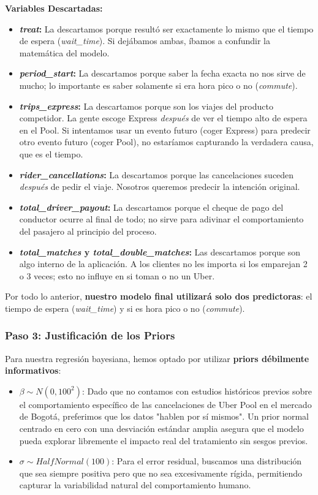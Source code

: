 \documentclass[11pt,a4paper]{article}
\begin{document}
\textbf{Variables Descartadas:}
\begin{itemize}
    \item \textbf{\textit{treat}:} La descartamos porque resultó ser exactamente lo mismo que el tiempo de espera (\textit{wait\_time}). Si dejábamos ambas, íbamos a confundir la matemática del modelo.
    \item \textbf{\textit{period\_start}:} La descartamos porque saber la fecha exacta no nos sirve de mucho; lo importante es saber solamente si era hora pico o no (\textit{commute}).
    \item \textbf{\textit{trips\_express}:} La descartamos porque son los viajes del producto competidor. La gente escoge Express \textit{después} de ver el tiempo alto de espera en el Pool. Si intentamos usar un evento futuro (coger Express) para predecir otro evento futuro (coger Pool), no estaríamos capturando la verdadera causa, que es el tiempo.
    \item \textbf{\textit{rider\_cancellations}:} La descartamos porque las cancelaciones suceden \textit{después} de pedir el viaje. Nosotros queremos predecir la intención original.
    \item \textbf{\textit{total\_driver\_payout}:} La descartamos porque el cheque de pago del conductor ocurre al final de todo; no sirve para adivinar el comportamiento del pasajero al principio del proceso.
    \item \textbf{\textit{total\_matches} y \textit{total\_double\_matches}:} Las descartamos porque son algo interno de la aplicación. A los clientes no les importa si los emparejan 2 o 3 veces; esto no influye en si toman o no un Uber.
\end{itemize}

Por todo lo anterior, \textbf{nuestro modelo final utilizará solo dos predictoras}: el tiempo de espera (\textit{wait\_time}) y si es hora pico o no (\textit{commute}).
\subsubsection*{Paso 3: Justificación de los Priors}
Para nuestra regresión bayesiana, hemos optado por utilizar \textbf{priors débilmente informativos}:
\begin{itemize}
    \item $\beta \sim N(0, 100^2)$: Dado que no contamos con estudios históricos previos sobre el comportamiento específico de las cancelaciones de Uber Pool en el mercado de Bogotá, preferimos que los datos "hablen por sí mismos". Un prior normal centrado en cero con una desviación estándar amplia asegura que el modelo pueda explorar libremente el impacto real del tratamiento sin sesgos previos.
    \item $\sigma \sim HalfNormal(100)$: Para el error residual, buscamos una distribución que sea siempre positiva pero que no sea excesivamente rígida, permitiendo capturar la variabilidad natural del comportamiento humano.
\end{itemize}
\end{document}
